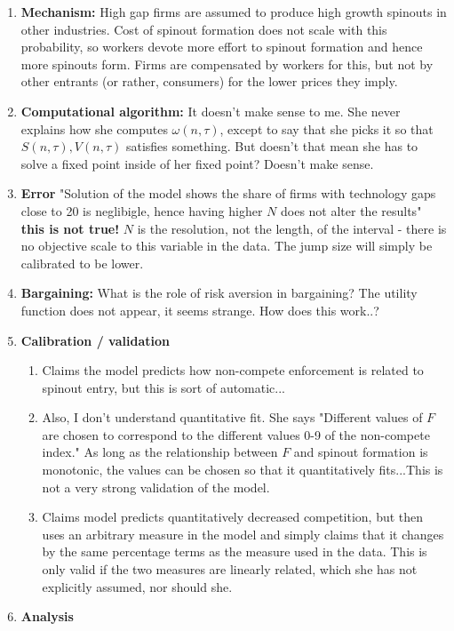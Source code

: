 \documentclass[12pt,english]{article}
\theoremstyle{remark}
\begin{document}
\begin{enumerate}
	\item \textbf{Mechanism:} High gap firms are assumed to produce high growth spinouts in other industries. Cost of spinout formation does not scale with this probability, so workers devote more effort to spinout formation and hence more spinouts form. Firms are compensated by workers for this, but not by other entrants (or rather, consumers) for the lower prices they imply. 
	\item \textbf{Computational algorithm: } It doesn't make sense to me. She never explains how she computes $\omega(n,\tau)$, except to say that she picks it so that $S(n,\tau),V(n,\tau)$ satisfies something. But doesn't that mean she has to solve a fixed point inside of her fixed point? Doesn't make sense.
	\item \textbf{Error} "Solution of the model shows the share of firms with technology gaps close to 20 is neglibigle, hence having higher $N$ does not alter the results" \textbf{this is not true!} $N$ is the resolution, not the length, of the interval - there is no objective scale to this variable in the data. The jump size will simply be calibrated to be lower. 
	\item \textbf{Bargaining:} What is the role of risk aversion in bargaining? The utility function does not appear, it seems strange. How does this work..?
	\item\textbf{Calibration / validation}
	\begin{enumerate}
		\item Claims the model predicts how non-compete enforcement is related to spinout entry, but this is sort of automatic...
		\item Also, I don't understand quantitative fit. She says "Different values of $F$ are chosen to correspond to the different values 0-9 of the non-compete index." As long as the relationship between $F$ and spinout formation is monotonic, the values can be chosen so that it quantitatively fits...This is not a very strong validation of the model. 
		\item Claims model predicts quantitatively decreased competition, but then uses an arbitrary measure in the model and simply claims that it changes by the same percentage terms as the measure used in the data. This is only valid if the two measures are linearly related, which she has not explicitly assumed, nor should she. 
	\end{enumerate} 
	\item \textbf{Analysis}
	\begin{enumerate}

\end{enumerate}
\end{enumerate}
\end{document}
